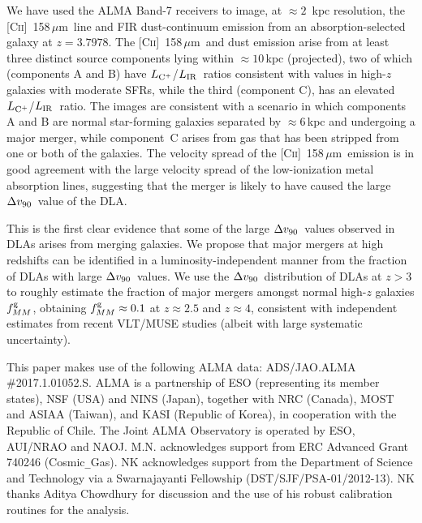 \documentclass[twocolumn]{aastex62}
\newcommand{\cplus}{[\ctwo]~158\,$\mu$m}
\newcommand{\zcube}{3.7978}
\newcommand{\rsep}{6}  %
\newcommand{\mdvninety}{\Delta v_{\rm 90}}
\newcommand{\dvninety}{$\mdvninety$}
\newcommand{\mfmg}{f_{MM}^{\rm g}}    %
\newcommand{\mldust}{L_{\rm IR}}  %
\newcommand{\ldust}{$\mldust$}
\newcommand{\mlcplus}{L_{\rm C^+}}   %
\newcommand{\lcplus}{$\mlcplus$}
\newcommand{\ctwo}{C\textsc{ii}}
\begin{document}
We have used the ALMA Band-7 receivers to image, at $\approx 2$~kpc resolution, the \cplus\ line 
and FIR dust-continuum emission from an absorption-selected galaxy at $z = \zcube$. 
The \cplus\ and dust emission arise from at least three distinct source components 
lying within $\approx 10$\,kpc (projected), two of which (components A and B) have 
\lcplus/\ldust\ ratios consistent with values
in high-$z$ galaxies with moderate SFRs, while the third (component C), 
has an elevated \lcplus/\ldust\ 
ratio. The images are consistent with a scenario in which components A and B are 
normal star-forming 
galaxies separated by $\approx \rsep$\,kpc and undergoing a major merger, while 
component~C arises from 
gas that has been stripped from one or both of the galaxies. 
The velocity spread of the \cplus\ emission 
is in good agreement with the large velocity spread of the low-ionization metal absorption 
lines, suggesting that the merger is likely to have caused the large \dvninety\ value of the DLA. 

This is the first clear evidence that some of the large \dvninety\ values observed in DLAs arises from merging
galaxies. We propose that major mergers at high redshifts can be identified in a luminosity-independent
manner from the fraction of DLAs with large \dvninety\ values. We use the \dvninety\ distribution 
of DLAs at $z > 3$ to roughly estimate the fraction of major mergers 
amongst normal high-$z$ galaxies $\mfmg$, 
obtaining $\mfmg \approx 0.1$ at $z\approx 2.5$ and $z \approx 4$, 
consistent with independent estimates 
from recent VLT/MUSE studies (albeit with large systematic uncertainty).


\acknowledgments
This paper makes use of the following ALMA data: ADS/JAO.ALMA \#2017.1.01052.S. ALMA 
is a partnership of ESO (representing its member states), NSF (USA) and NINS (Japan), 
together with NRC (Canada), MOST and ASIAA (Taiwan), and KASI (Republic of Korea), in 
cooperation with the Republic of Chile. The Joint ALMA Observatory is operated by ESO, 
AUI/NRAO and NAOJ. M.N. acknowledges support from ERC Advanced Grant 740246 (Cosmic{\verb|_|}Gas). 
NK acknowledges support from the Department of Science and Technology via a Swarnajayanti 
Fellowship (DST/SJF/PSA-01/2012-13). NK thanks Aditya Chowdhury for discussion and the use of 
his robust calibration routines for the analysis.


\end{document}

